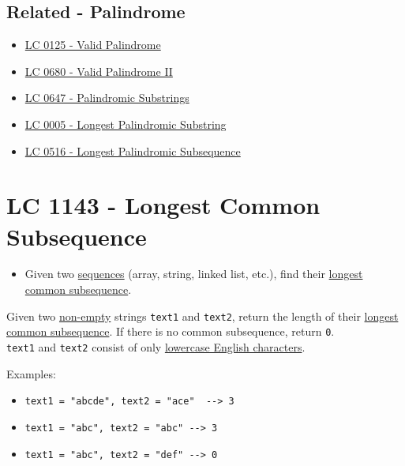 \subsection*{Related - Palindrome}
\begin{itemize}
	\item \hyperref[lc0125]{LC 0125 - Valid Palindrome}
 	\item \hyperref[lc0680]{LC 0680 - Valid Palindrome II}
	\item \hyperref[lc0647]{LC 0647 - Palindromic Substrings}
	\item \hyperref[lc0005]{LC 0005 - Longest Palindromic Substring}
	\item \hyperref[lc0516]{LC 0516 - Longest Palindromic Subsequence}
\end{itemize}

\section{LC 1143 - Longest Common Subsequence}\label{lc1143}
\begin{tcolorbox}
\begin{itemize}
\item Given two \ul{sequences} (array, string, linked list, etc.), find their \ul{longest common subsequence}.
\end{itemize}
\end{tcolorbox}
Given two \ul{non-empty} strings {\colorbox{CodeBackground}{\lstinline|text1|}} and {\colorbox{CodeBackground}{\lstinline|text2|}}, return the length of their \ul{longest common subsequence}. If there is no common subsequence, return {\colorbox{CodeBackground}{\lstinline|0|}}.\\

{\colorbox{CodeBackground}{\lstinline|text1|}} and {\colorbox{CodeBackground}{\lstinline|text2|}} consist of only \ul{lowercase English characters}.

Examples:
\begin{itemize}
	\item {\colorbox{CodeBackground}{\lstinline|text1 = "abcde", text2 = "ace"  --> 3|}}
	\item {\colorbox{CodeBackground}{\lstinline|text1 = "abc", text2 = "abc" --> 3|}}
	\item {\colorbox{CodeBackground}{\lstinline|text1 = "abc", text2 = "def" --> 0|}}
\end{itemize}

